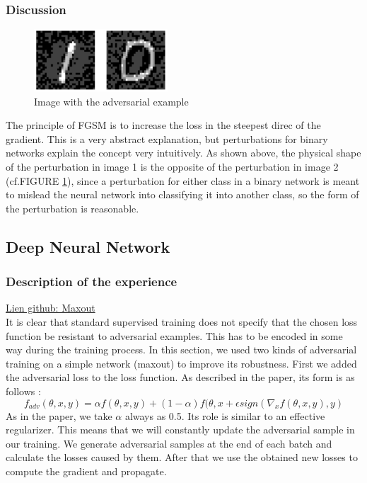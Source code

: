 \subsubsection{Discussion}
\FloatBarrier
\begin{figure}[htbp]
        \centering
        \includegraphics[width=5cm]{gradiant.PNG}%
        \caption{Image with the adversarial example}
        \label{gradient}
\end{figure}\par
\FloatBarrier
The principle of FGSM is  to increase the loss in the steepest direc of the gradient. This is a very abstract explanation, but perturbations for binary networks explain the concept very intuitively. As shown above, the physical shape of the perturbation in image 1 is the opposite of the perturbation in image 2 (cf.FIGURE \ref{gradient}), since a perturbation for either class in a binary network is meant to mislead the neural network into classifying it into another class, so the form of the perturbation is reasonable.


\subsection{Deep Neural Network}
\subsubsection{Description of the experience}
\href{https://github.com/LIUHanlin16895/MLA_projet/blob/main/src/maxout/ProjetMLAmaxoutFGSM.ipynb}{Lien github: Maxout} \\

It is clear that standard supervised training does not specify that the chosen loss function be resistant to adversarial examples. This has to be encoded in some way during the training process. In this section, we used two kinds of adversarial training on a simple network (maxout) to improve its robustness. First we added the adversarial loss to the loss function. As described in the paper, its form is as follows :
$$ f_{adv}(\theta,x,y) = \alpha f(\theta,x,y) +(1-\alpha )f(\theta,x+\epsilon sign(\nabla_{x}f(\theta,x,y),y) $$
As in the paper, we take $\alpha$ always as 0.5. Its role is similar to an effective regularizer. This means that we will constantly update the adversarial sample in our training. We generate adversarial samples at the end of each batch and calculate the losses caused by them. After that we use the obtained new losses to compute the gradient and propagate.


